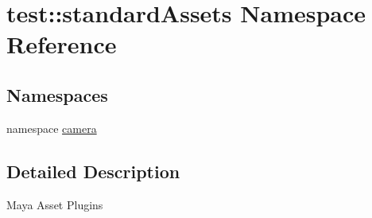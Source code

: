 \hypertarget{namespacetest_1_1standardAssets}{\section{test\-:\-:standard\-Assets \-Namespace \-Reference}
\label{da/d8d/namespacetest_1_1standardAssets}
}
\subsection*{\-Namespaces}
\begin{DoxyCompactItemize}
\item 
namespace \hyperlink{namespacetest_1_1standardAssets_1_1camera}{camera}
\end{DoxyCompactItemize}


\subsection{\-Detailed \-Description}
\begin{DoxyVerb}
Maya Asset Plugins
\end{DoxyVerb}
 